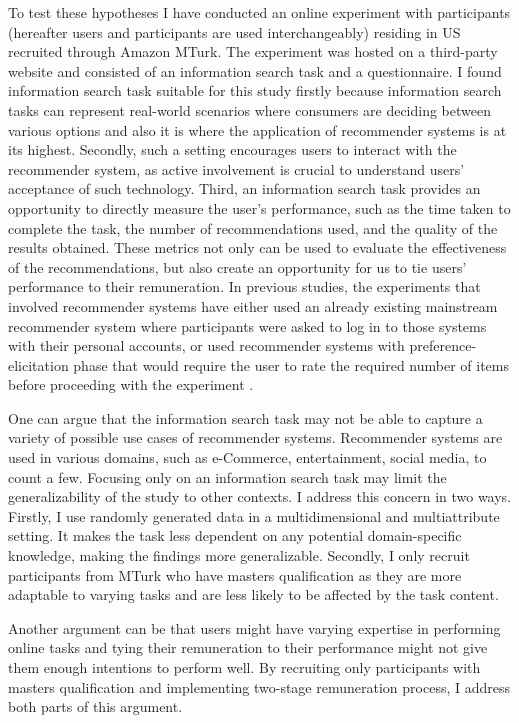 \documentclass[a4paper,12pt]{article}
\begin{document}
To test these hypotheses I have conducted an online experiment with participants (hereafter users and participants are used interchangeably) residing in US recruited through Amazon MTurk. The experiment was hosted on a third-party website and consisted of an information search task and a questionnaire. I found information search task suitable for this study firstly because information search tasks can represent real-world scenarios where consumers are deciding between various options and also it is where the application of recommender systems is at its highest. Secondly, such a setting encourages users to interact with the recommender system, as active involvement is crucial to understand users' acceptance of such technology. Third, an information search task provides an opportunity to directly measure the user's performance, such as the time taken to complete the task, the number of recommendations used, and the quality of the results obtained. These metrics not only can be used to evaluate the effectiveness of the recommendations, but also create an opportunity for us to tie users' performance to their remuneration. In previous studies, the experiments that involved recommender systems have either used an already existing mainstream recommender system where participants were asked to log in to those systems with their personal accounts, or used recommender systems with preference-elicitation phase that would require the user to rate the required number of items before proceeding with the experiment \citep{millecampControllingSpotifyRecommendations2018}. 

One can argue that the information search task may not be able to capture a variety of possible use cases of recommender systems. Recommender systems are used in various domains, such as e-Commerce, entertainment, social media, to count a few. Focusing only on an information search task may limit the generalizability of the study to other contexts. I address this concern in two ways. Firstly, I use randomly generated data in a multidimensional and multiattribute setting. It makes the task less dependent on any potential domain-specific knowledge, making the findings more generalizable. Secondly, I only recruit participants from MTurk who have masters qualification as they are more adaptable to varying tasks and are less likely to be affected by the task content. 

Another argument can be that users might have varying expertise in performing online tasks and tying their remuneration to their performance might not give them enough intentions to perform well. By recruiting only participants with masters qualification and implementing two-stage remuneration process, I address both parts of this argument.
\end{document}
